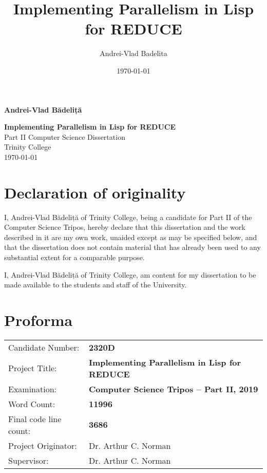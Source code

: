 \documentclass[a4paper,12pt,twoside,openany]{report}
\date{\today}
\title{Implementing Parallelism in Lisp for REDUCE}
\author{Andrei-Vlad Badelita}
\begin{document}

\hfill{\LARGE \bf Andrei-Vlad Bădeliță}

\pagestyle{empty}

\vspace*{60mm}
\begin{center}
\Huge{\bf Implementing Parallelism in Lisp for REDUCE} \\
\vspace*{5mm}
Part II Computer Science Dissertation \\
\vspace*{5mm}
Trinity College \\
\vspace*{5mm}
\today  %
\end{center}

\cleardoublepage


\pagestyle{plain}

\section*{Declaration of originality}

I, Andrei-Vlad Bădeliță of Trinity College, being a candidate for Part II of the
Computer Science Tripos, hereby declare that this dissertation and the work described
in it are my own work, unaided except as may be specified below, and that the
dissertation does not contain material that has already been used to any
substantial extent for a comparable purpose.

\medskip
\noindent
I, Andrei-Vlad Bădeliță of Trinity College, am content for my dissertation
to be made available to the students and staff of the University.

\bigskip
{}

\medskip
{}

\newpage

\section*{Proforma}

{\large
\begin{tabular}{ll}
Candidate Number:   & \bf 2320D \\
Project Title:      & \bf Implementing Parallelism in Lisp for REDUCE \\
Examination:        & \bf Computer Science Tripos -- Part II, 2019  \\
Word Count:         & \bf 11996          \\
Final code line count: & \bf 3686        \\
Project Originator: & Dr. Arthur C. Norman                    \\
Supervisor:         & Dr. Arthur C. Norman                    \\
\end{tabular}
}
\end{document}
